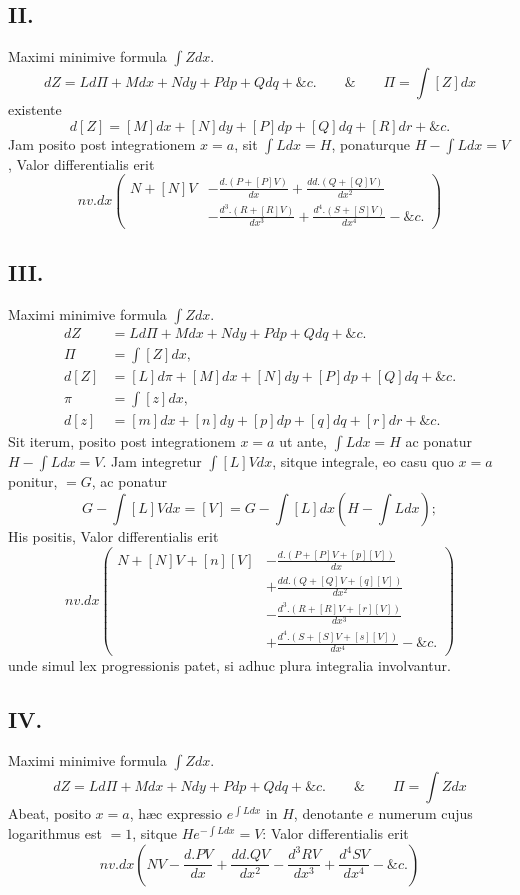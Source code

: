 \subsection*{II.}
Maximi minimive formula $\int Zdx$.
\[dZ=Ld\Pi+Mdx+Ndy+Pdp+Qdq+\&c.\qquad\&\qquad\Pi=\int[Z]dx\]
existente
\[d[Z]=[M]dx+[N]dy+[P]dp+[Q]dq+[R]dr+\&c.\]
Jam posito post integrationem $x=a$, sit $\int Ldx=H$, ponaturque $H-\int Ldx=V$, Valor differentialis erit
\[nv.dx\left(\begin{aligned}N+[N]V&-\frac{d.(P+[P]V)}{dx}+\frac{dd.(Q+[Q]V)}{dx^2}\\&-\frac{d^3.(R+[R]V)}{dx^3}+\frac{d^4.(S+[S]V)}{dx^4}-\&c.\end{aligned}\right)\]
\subsection*{III.}
Maximi minimive formula $\int Zdx$.
\[\begin{aligned}dZ&=Ld\Pi+Mdx+Ndy+Pdp+Qdq+\&c.\\\Pi&=\int[Z]dx,\\d[Z]&=[L]d\pi+[M]dx+[N]dy+[P]dp+[Q]dq+\&c.\\\pi&=\int[z]dx,\\d[z]&=[m]dx+[n]dy+[p]dp+[q]dq+[r]dr+\&c.\end{aligned}\]
Sit iterum, posito post integrationem $x=a$ ut ante, $\int Ldx=H$
ac ponatur $H-\int Ldx=V$. Jam integretur $\int[L]Vdx$, sitque integrale, eo casu quo $x=a$ ponitur, $=G$, ac ponatur
\[G-\int[L]Vdx=[V]=G-\int[L]dx\left(H-\int Ldx\right);\]
His positis, Valor differentialis erit
\[nv.dx\left(\begin{aligned}N+[N]V+[n][V]&-\frac{d.(P+[P]V+[p][V])}{dx}\\&+\frac{dd.(Q+[Q]V+[q][V])}{dx^2}\\&-\frac{d^3.(R+[R]V+[r][V])}{dx^3}\\&+\frac{d^4.(S+[S]V+[s][V])}{dx^4}-\&c.\end{aligned}\right)\]
unde simul lex progressionis patet, si adhuc plura integralia involvantur.
\subsection*{IV.}
Maximi minimive formula $\int Zdx$.
\[dZ=Ld\Pi+Mdx+Ndy+Pdp+Qdq+\&c.\qquad\&\qquad\Pi=\int Zdx\]
Abeat, posito $x=a$, hæc expressio $e^{\int Ldx}$ in $H$, denotante $e$ numerum cujus logarithmus est $=1$, sitque $He^{-\int Ldx}=V$: Valor differentialis erit
\[nv.dx\left(NV-\frac{d.PV}{dx}+\frac{dd.QV}{dx^2}-\frac{d^3RV}{dx^3}+\frac{d^4SV}{dx^4}-\&c.\right)\]
